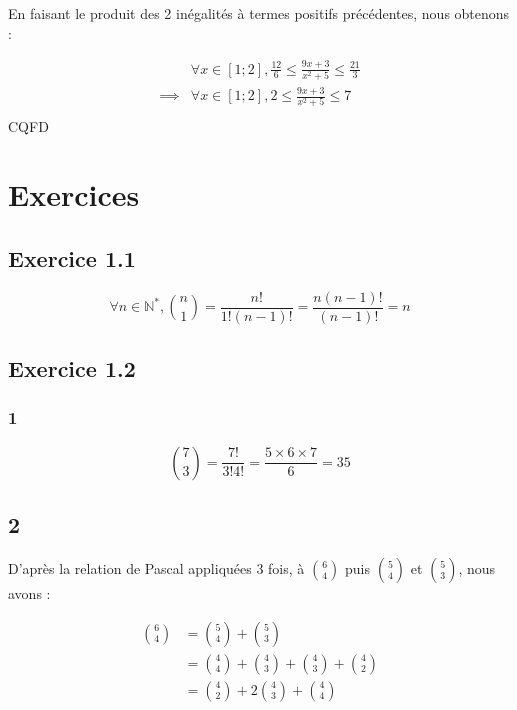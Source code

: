 \documentclass{report}
\begin{document}
En faisant le produit des 2 inégalités à termes positifs précédentes, nous obtenons :
 
\begin{equation*}
	\begin{split}
		         & \forall x \in [1 ; 2], \frac{12}{6} \le \frac{9x + 3}{x^2+5} \le \frac{21}{3} \\
		\implies & \forall x \in [1 ; 2], 2 \le \frac{9x + 3}{x^2+5} \le 7 \\
	\end{split}
\end{equation*}
CQFD

\section*{Exercices}

\subsection*{Exercice 1.1}

\[ \forall n \in \mathbb{N}^*, \binom{n}{1} =\frac{n!}{1!(n-1)!} = \frac{n(n-1)!}{(n-1)!} = n\]

\subsection*{Exercice 1.2}

\subsubsection*{1}
\[ \binom{7}{3} = \frac{7!}{3!4!} = \frac{5 \times 6 \times 7}{6} = 35\]

\subsection*{2}

D'après la relation de Pascal appliquées 3 fois, à $\binom{6}{4}$ puis $\binom{5}{4}$ et $\binom{5}{3}$,  nous avons :

\begin{equation*}
	\begin{split}
		\binom{6}{4} &= \binom{5}{4} + \binom{5}{3} \\
		             &= \binom{4}{4} + \binom{4}{3} + \binom{4}{3} + \binom{4}{2} \\
		             &= \binom{4}{2} + 2\binom{4}{3} + \binom{4}{4}
	\end{split}
\end{equation*}
\end{document}
